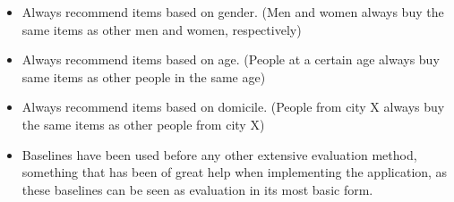 \begin{itemize}
    \item Always recommend items based on gender. (Men and women always buy the same items as other men and women, respectively)
    \item Always recommend items based on age. (People at a certain age always buy same items as other people in the same age)
    \item Always recommend items based on domicile. (People from city X always buy the same items as other people from city X)
    \item Baselines have been used before any other extensive evaluation method, something that has been of great help when implementing the application, as these baselines can be seen as evaluation in its most basic form.
    
    \end{itemize}


